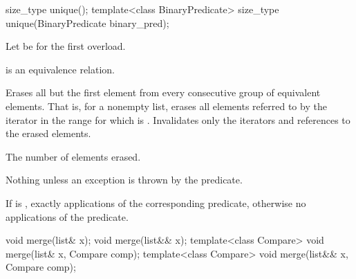 %
\begin{itemdecl}
size_type unique();
template<class BinaryPredicate> size_type unique(BinaryPredicate binary_pred);
\end{itemdecl}

\begin{itemdescr}
\pnum
Let  be  for the first overload.

\pnum
\expects
{} is an equivalence relation.

\pnum
\effects
Erases all but the first element from every
consecutive group of equivalent elements.
That is, for a nonempty list, erases all elements referred to
by the iterator  in the range 
for which  is .
Invalidates only the iterators and references to the erased elements.

\pnum
\returns
The number of elements erased.

\pnum
\throws
Nothing unless an exception is thrown by the predicate.

\pnum
\complexity
If  is ,
exactly  applications of the corresponding predicate,
otherwise no applications of the predicate.
\end{itemdescr}

%
\begin{itemdecl}
void merge(list& x);
void merge(list&& x);
template<class Compare> void merge(list& x, Compare comp);
template<class Compare> void merge(list&& x, Compare comp);
\end{itemdecl}

